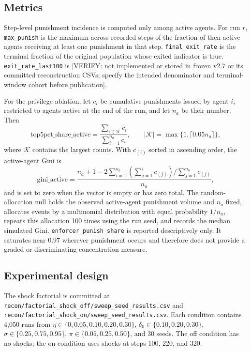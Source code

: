 \subsection{Metrics}

Step-level punishment incidence is computed only among active agents. For run \(r\), \texttt{max\_punish} is the maximum across recorded steps of the fraction of then-active agents receiving at least one punishment in that step. \texttt{final\_exit\_rate} is the terminal fraction of the original population whose exited indicator is true. \texttt{exit\_rate\_last100} is [VERIFY: not implemented or stored in frozen v2.7 or its committed reconstruction CSVs; specify the intended denominator and terminal-window cohort before publication].

For the privilege ablation, let \(c_i\) be cumulative punishments issued by agent \(i\), restricted to agents active at the end of the run, and let \(n_a\) be their number. Then
\begin{equation}
 \mathrm{top5pct\_share\_active}=\frac{\sum_{i\in\mathcal{K}}c_i}{\sum_{i=1}^{n_a}c_i},\qquad |\mathcal{K}|=\max\{1,\lceil0.05n_a\rceil\},
\end{equation}
where \(\mathcal{K}\) contains the largest counts. With \(c_{(i)}\) sorted in ascending order, the active-agent Gini is
\begin{equation}
 \mathrm{gini\_active}=\frac{n_a+1-2\sum_{i=1}^{n_a}\left(\sum_{j=1}^{i}c_{(j)}\right)/\sum_{j=1}^{n_a}c_{(j)}}{n_a},
\end{equation}
and is set to zero when the vector is empty or has zero total. The random-allocation null holds the observed active-agent punishment volume and \(n_a\) fixed, allocates events by a multinomial distribution with equal probability \(1/n_a\), repeats this allocation 100 times using the run seed, and records the median simulated Gini. \texttt{enforcer\_punish\_share} is reported descriptively only. It saturates near 0.97 wherever punishment occurs and therefore does not provide a graded or discriminating concentration measure.

\subsection{Experimental design}

The shock factorial is committed at \texttt{recon/factorial\_shock\_off/sweep\_seed\_results.csv} and \texttt{recon/factorial\_shock\_on/sweep\_seed\_results.csv}. Each condition contains 4,050 runs from \(\eta\in\{0,0.05,0.10,0.20,0.30\}\), \(\delta_0\in\{0.10,0.20,0.30\}\), \(\sigma\in\{0.25,0.75,0.95\}\), \(\pi\in\{0.05,0.25,0.50\}\), and 30 seeds. The off condition has no shocks; the on condition uses shocks at steps 100, 220, and 320.

